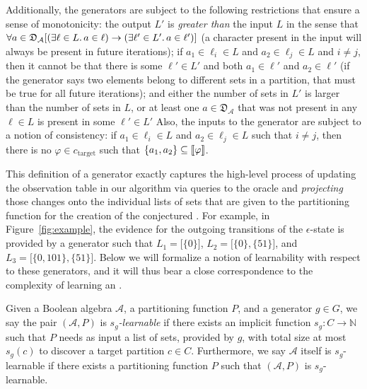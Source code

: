 Additionally, the generators are subject to the following restrictions
that ensure a sense of monotonicity:
%
\rone the output $L'$ is \emph{greater than}
the input $L$ in the sense that 
$\forall a \in \mathfrak{D}_\mathcal{A}
\lbrack (\exists \ell \in L \ldotp a \in \ell) \rightarrow
(\exists \ell' \in L' \ldotp a \in \ell')\rbrack$
(a character present in the input
will always be present in future iterations);
\rtwo if $a_1 \in \ell_i \in L$ and $a_2 \in \ell_j \in L$
and $i \neq j$, then
it cannot be that there is some $\ell' \in L'$ and
both $a_1 \in \ell'$ and $a_2 \in \ell'$
(if the generator says two elements belong to different
sets in a partition, that must be true for all future iterations);
and \rthree either
the number of sets in $L'$ is larger than
the number of sets in $L$, or
at least one $a \in \mathfrak{D}_\mathcal{A}$
that was not present in any $\ell \in L$ is present in some $\ell' \in L'$
%
Also, the inputs to the generator are subject to a notion of consistency:
if $a_1 \in \ell_i \in L$ and $a_2 \in \ell_j \in L$
such that $i \neq j$, then there is no
$\varphi \in c_\text{target}$ such that
$\{a_1, a_2\} \subseteq \llbracket {\varphi} \rrbracket$.

This definition of a generator exactly captures
the high-level process of updating the observation
table in our algorithm via queries to the oracle
and \emph{projecting} those changes onto
the individual lists of sets that are given
to the partitioning function for the creation
of the conjectured \SFA.
For example, in Figure~\ref{fig:example},
the evidence for the outgoing transitions
of the $\epsilon$-state is provided by a generator such that
$L_1 = \lbrack\{0\}\rbrack$,
$L_2 = \lbrack\{0\}, \{51\}\rbrack$,
and $L_3 = \lbrack\{0,101\},\{51\}\rbrack$.
Below we will formalize
a notion of learnability with respect
to these generators, and it will thus
bear a close correspondence to the
complexity of learning an \SFA.

\begin{definition}[$s_g$-learnability]
    Given a Boolean algebra $\mathcal{A}$,
    a partitioning function $P$, and
    a generator $g \in G$,
    we say the pair $(\mathcal{A}, P)$ is \emph{$s_g$-learnable}
    if there exists an implicit function
    $s_g : C \rightarrow \mathbb{N}$
    such that $P$ needs as input a list of sets,
    provided by $g$,
    with total size at most $s_g(c)$
    to discover a target partition $c \in C$.
    Furthermore, we say $\mathcal{A}$ itself
    is $s_g$-learnable if there exists
    a partitioning function $P$
    such that $(\mathcal{A}, P)$ is $s_g$-learnable.
\end{definition}

